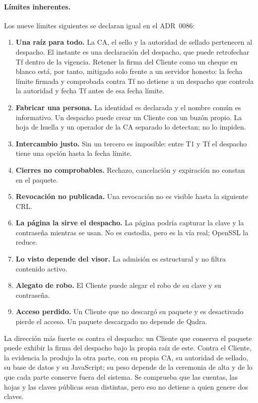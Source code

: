 \paragraph{Límites inherentes.} Los nueve límites siguientes se declaran
igual en el ADR~0086:
\begin{enumerate}[label=(\alph*)]
  \item \textbf{Una raíz para todo.} La CA, el sello y la autoridad de sellado
  pertenecen al despacho. El instante es una declaración del despacho, que
  puede retrofechar Tf dentro de la vigencia. Retener la firma del Cliente como
  un cheque en blanco está, por tanto, mitigado solo frente a un servidor
  honesto: la fecha límite firmada y comprobada contra Tf no detiene a un
  despacho que controla la autoridad y fecha Tf antes de esa fecha límite.
  \item \textbf{Fabricar una persona.} La identidad es declarada y el nombre
  común es informativo. Un despacho puede crear un Cliente con un buzón propio.
  La hoja de huella y un operador de la CA separado lo detectan; no lo impiden.
  \item \textbf{Intercambio justo.} Sin un tercero es imposible: entre T1 y Tf
  el despacho tiene una opción hasta la fecha límite.
  \item \textbf{Cierres no comprobables.} Rechazo, cancelación y expiración no
  constan en el paquete.
  \item \textbf{Revocación no publicada.} Una revocación no es visible hasta la
  siguiente CRL.
  \item \textbf{La página la sirve el despacho.} La página podría capturar la
  clave y la contraseña mientras se usan. No es custodia, pero es la vía real;
  OpenSSL la reduce.
  \item \textbf{Lo visto depende del visor.} La admisión es estructural y no
  filtra contenido activo.
  \item \textbf{Alegato de robo.} El Cliente puede alegar el robo de su clave y
  su contraseña.
  \item \textbf{Acceso perdido.} Un Cliente que no descargó su paquete y es
  desactivado pierde el acceso. Un paquete descargado no depende de Qadra.
\end{enumerate}

La dirección más fuerte es contra el despacho: un Cliente que conserva el
paquete puede exhibir la firma del despacho bajo la propia raíz de este.
Contra el Cliente, la evidencia la produjo la otra parte, con su propia CA, su
autoridad de sellado, su base de datos y su JavaScript; su peso depende de la
ceremonia de alta y de lo que cada parte conserve fuera del sistema. Se
comprueba que las cuentas, las hojas y las claves públicas sean distintas, pero
eso no detiene a quien genere dos claves.

